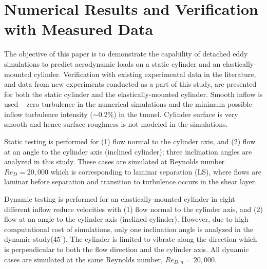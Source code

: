 \section{Numerical Results and Verification with Measured Data}
\label{sec:comp_results}
%
The objective of this paper is to demonstrate the capability of detached eddy
simulations to predict aerodynamic loads on a static cylinder and an
elastically-mounted cylinder.  Verification with existing experimental data in
the literature, and data from new experiments conducted as a part of this
study, are presented for both the static cylinder and the elastically-mounted
cylinder. Smooth inflow is used -- zero turbulence in the numerical simulations
and the minimum possible inflow turbulence intensity ($\sim$0.2\%) in the
tunnel. Cylinder surface is very smooth and hence surface roughness is not
modeled in the simulations.

Static testing is performed for (1) flow normal to the cylinder axis, and (2)
flow at an angle to the cylinder axis (inclined cylinder); three inclination
angles are analyzed in this study. These cases are simulated at Reynolds number
$Re_D=20,000$ which is corresponding to laminar separation (LS), where flows
are laminar before separation and transition to turbulence occurs in the shear
layer.

Dynamic testing is performed for an elastically-mounted cylinder in eight
different inflow reduce velocities with (1) flow normal to the cylinder axis,
and (2) flow at an angle to the cylinder axis (inclined cylinder). However, due
to high computational cost of simulations, only one inclination angle is
analyzed in the dynamic study($45^\circ$). The cylinder is limited to vibrate
along the direction which is perpendicular to both the flow direction and the
cylinder axis. All dynamic cases are simulated at the same Reynolds number,
$Re_{D,n}=20,000$.





